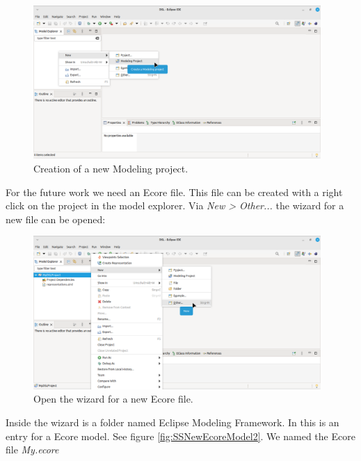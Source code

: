 \documentclass[a4paper,10pt]{article}
\newcommand{\gerquot}[1]{\glqq#1\grqq}
\newcommand{\EMF}{Eclipse Modeling Framework}
\newcommand{\ScreenshotWidth}{0.975}
\begin{document}
\begin{figure}
\centering
\includegraphics[width=\ScreenshotWidth\textwidth]{./Screenshots/SS_3.png}
\caption{Creation of a new Modeling project.}
\label{fig:SSNewModellingProject}
\end{figure}

For the future work we need an Ecore file. This file can be created with a right click on the project in the model explorer. Via \emph{New > Other...} the wizard for a new file can be opened:

\begin{figure}[H]
\centering
\includegraphics[width=\ScreenshotWidth\textwidth]{./Screenshots/SS_4.png}
\caption{Open the wizard for a new Ecore file.}
\label{fig:SSNewEcoreModel1}
\end{figure}

Inside the wizard is a folder named \gerquot{\EMF}. In this is an entry for a Ecore model. See figure \ref{fig:SSNewEcoreModel2}. We named the Ecore file \emph{My.ecore}
\end{document}
